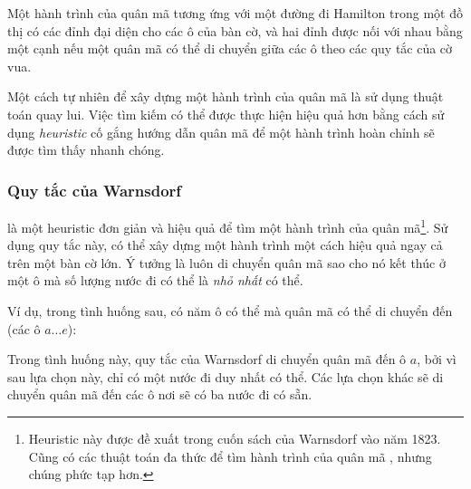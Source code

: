 Một hành trình của quân mã tương ứng với một đường đi Hamilton trong một đồ thị
có các đỉnh đại diện cho các ô của bàn cờ,
và hai đỉnh được nối với nhau bằng một cạnh nếu một quân mã
có thể di chuyển giữa các ô theo các quy tắc của cờ vua.

Một cách tự nhiên để xây dựng một hành trình của quân mã là sử dụng thuật toán quay lui.
Việc tìm kiếm có thể được thực hiện hiệu quả hơn bằng cách sử dụng
\emph{heuristic} cố gắng hướng dẫn quân mã để
một hành trình hoàn chỉnh sẽ được tìm thấy nhanh chóng.

\subsubsection{Quy tắc của Warnsdorf}


 là một heuristic đơn giản và hiệu quả
để tìm một hành trình của quân mã\footnote{Heuristic này được đề xuất
trong cuốn sách của Warnsdorf \cite{war23} vào năm 1823. Cũng có
các thuật toán đa thức để tìm hành trình của quân mã
\cite{par97}, nhưng chúng phức tạp hơn.}.
Sử dụng quy tắc này, có thể xây dựng một hành trình một cách hiệu quả
ngay cả trên một bàn cờ lớn.
Ý tưởng là luôn di chuyển quân mã sao cho nó kết thúc
ở một ô mà số lượng nước đi có thể là
\emph{nhỏ nhất} có thể.

Ví dụ, trong tình huống sau, có năm
ô có thể mà quân mã có thể di chuyển đến (các ô $a \ldots e$):
\begin{center}
\end{center}
Trong tình huống này, quy tắc của Warnsdorf di chuyển quân mã đến ô $a$,
bởi vì sau lựa chọn này, chỉ có một nước đi duy nhất có thể.
Các lựa chọn khác sẽ di chuyển quân mã đến các ô nơi
sẽ có ba nước đi có sẵn.


